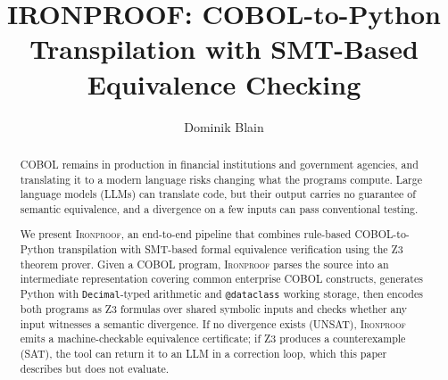 \documentclass[sigconf,nonacm]{acmart}
\begin{document}
\title{IRONPROOF: COBOL-to-Python Transpilation with SMT-Based Equivalence Checking}

\author{Dominik Blain}


\begin{abstract}
COBOL remains in production in financial institutions and government agencies, and translating it to a modern language risks changing what the programs compute. Large language models (LLMs) can translate code, but their output carries no guarantee of semantic equivalence, and a divergence on a few inputs can pass conventional testing.

We present \textsc{Ironproof}, an end-to-end pipeline that combines rule-based COBOL-to-Python transpilation with SMT-based formal equivalence verification using the Z3 theorem prover. Given a COBOL program, \textsc{Ironproof} parses the source into an intermediate representation covering common enterprise COBOL constructs, generates Python with \texttt{Decimal}-typed arithmetic and \texttt{@dataclass} working storage, then encodes both programs as Z3 formulas over shared symbolic inputs and checks whether any input witnesses a semantic divergence. If no divergence exists (UNSAT), \textsc{Ironproof} emits a machine-checkable equivalence certificate; if Z3 produces a counterexample (SAT), the tool can return it to an LLM in a correction loop, which this paper describes but does not evaluate.


\end{abstract}
\end{document}
